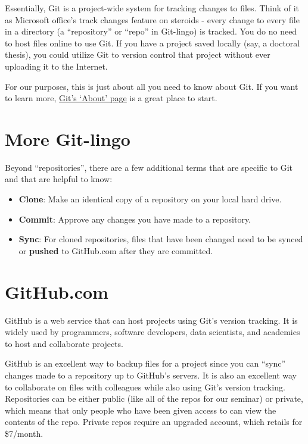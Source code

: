 \documentclass[]{book}
\providecommand{\tightlist}{%
  \setlength{\itemsep}{0pt}\setlength{\parskip}{0pt}}
\theoremstyle{definition}
\theoremstyle{definition}
\theoremstyle{definition}
\theoremstyle{remark}
\begin{document}
Essentially, Git is a project-wide system for tracking changes to files.
Think of it as Microsoft office's track changes feature on steroids -
every change to every file in a directory (a ``repository'' or ``repo''
in Git-lingo) is tracked. You do no need to host files online to use
Git. If you have a project saved locally (say, a doctoral thesis), you
could utilize Git to version control that project without ever uploading
it to the Internet.

For our purposes, this is just about all you need to know about Git. If
you want to learn more, \href{https://git-scm.com/about}{Git's `About'
page} is a great place to start.

\section{More Git-lingo}\label{more-git-lingo}

Beyond ``repositories'', there are a few additional terms that are
specific to Git and that are helpful to know:

\begin{itemize}
\tightlist
\item
  \textbf{Clone}: Make an identical copy of a repository on your local
  hard drive.
\item
  \textbf{Commit}: Approve any changes you have made to a repository.
\item
  \textbf{Sync}: For cloned repositories, files that have been changed
  need to be synced or \textbf{pushed} to GitHub.com after they are
  committed.
\end{itemize}

\section{GitHub.com}\label{github.com}

GitHub is a web service that can host projects using Git's version
tracking. It is widely used by programmers, software developers, data
scientists, and academics to host and collaborate projects.

GitHub is an excellent way to backup files for a project since you can
``sync'' changes made to a repository up to GitHub's servers. It is also
an excellent way to collaborate on files with colleagues while also
using Git's version tracking. Repositories can be either public (like
all of the repos for our seminar) or private, which means that only
people who have been given access to can view the contents of the repo.
Private repos require an upgraded account, which retails for \$7/month.
\end{document}

